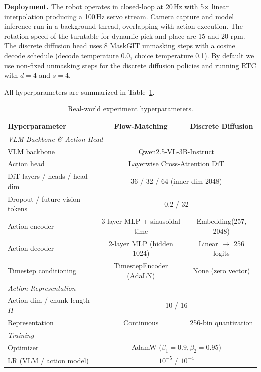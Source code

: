 \documentclass{article}
\begin{document}
\textbf{Deployment.}
The robot operates in closed-loop at 20\,Hz with 5$\times$ linear interpolation producing a 100\,Hz servo stream.
Camera capture and model inference run in a background thread, overlapping with action execution.
The rotation speed of the turntable for dynamic pick and place are 15 and 20 rpm.
The discrete diffusion head uses 8 MaskGIT unmasking steps with a cosine decode schedule (decode temperature 0.0, choice temperature 0.1).
By default we use non-fixed unmasking steps for the discrete diffusion policies and running RTC with $d=4$ and $s=4$.

All hyperparameters are summarized in Table~\ref{tab:real_hyperparams}.



\begin{table}[h]
\centering
\caption{Real-world experiment hyperparameters.}
\label{tab:real_hyperparams}
\begin{tabular}{lcc}
\toprule
\textbf{Hyperparameter} & \textbf{Flow-Matching} & \textbf{Discrete Diffusion} \\
\midrule
\multicolumn{3}{l}{\textit{VLM Backbone \& Action Head}} \\
VLM backbone & \multicolumn{2}{c}{Qwen2.5-VL-3B-Instruct} \\
Action head & \multicolumn{2}{c}{Layerwise Cross-Attention DiT} \\
DiT layers / heads / head dim & \multicolumn{2}{c}{36 / 32 / 64 (inner dim 2048)} \\
Dropout / future vision tokens & \multicolumn{2}{c}{0.2 / 32} \\
Action encoder & 3-layer MLP + sinusoidal time & Embedding(257, 2048) \\
Action decoder & 2-layer MLP (hidden 1024) & Linear $\rightarrow$ 256 logits \\
Timestep conditioning & TimestepEncoder (AdaLN) & None (zero vector) \\
\midrule
\multicolumn{3}{l}{\textit{Action Representation}} \\
Action dim / chunk length $H$ & \multicolumn{2}{c}{10 / 16} \\
Representation & Continuous & 256-bin quantization \\
\midrule
\multicolumn{3}{l}{\textit{Training}} \\
Optimizer & \multicolumn{2}{c}{AdamW ($\beta_1{=}0.9, \beta_2{=}0.95$)} \\
LR (VLM / action model) & \multicolumn{2}{c}{$10^{-5}$ / $10^{-4}$} \\

\end{tabular}
\end{table}
\end{document}
